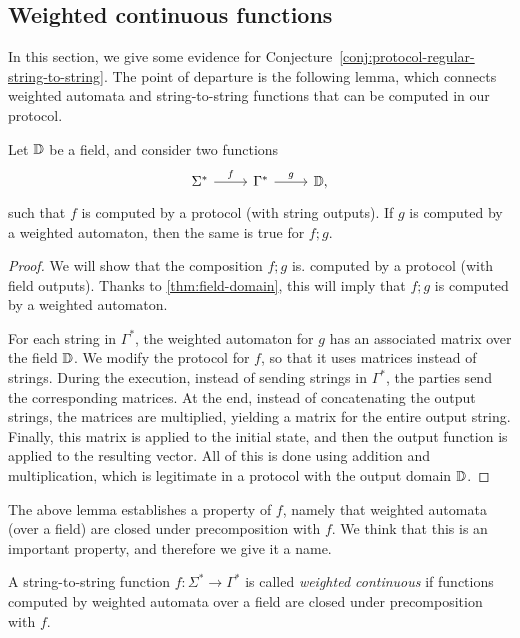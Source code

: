 \subsection{Weighted continuous functions}
\label{sec:continuity}
In this section, we give some evidence for Conjecture~\ref{conj:protocol-regular-string-to-string}. The point of departure is the following lemma, which connects weighted automata and string-to-string functions that can be computed in our protocol.

    \begin{lemma}
        \label{lem:postcomposition-weighted-automaton}
        Let $\mathbb D$ be a field, and consider two functions
        \[
        \begin{tikzcd}
        \Sigma^* 
        \ar[r,"f"]
        &
        \Gamma^*
        \ar[r,"g"]
        & 
        \domain,
        \end{tikzcd}
        \]
        such that $f$ is computed by a protocol (with string outputs). If $g$  is computed by a weighted automaton, then the same is true for  $f;g$.
    \end{lemma}
    \begin{proof}
        We will show that the composition $f;g$ is. computed by a protocol (with field outputs). Thanks to \cref{thm:field-domain}, this will imply that $f;g$ is computed by a weighted automaton.

        For each string in $\Gamma^*$, the weighted automaton for $g$ has an associated matrix over the field $\mathbb D$. We modify the protocol for $f$, so that it uses matrices instead of strings. During the execution, instead of sending strings in $\Gamma^*$, the parties send  the corresponding matrices. At the end, instead of concatenating the output strings, the matrices are multiplied, yielding a matrix for the entire output string. Finally, this matrix is applied to the initial state, and then the output function is applied to the resulting vector. All of this is done using addition and multiplication, which is legitimate in a protocol with the output domain $\mathbb D$.
    \end{proof}


The above lemma establishes a property of $f$, namely that weighted automata (over a field) are closed under precomposition with $f$. We think that this is an important property, and therefore we give it a name.


\begin{definition}
    \label{def:weighted-continuity}
    A string-to-string function $f : \Sigma^* \to \Gamma^*$ is called \emph{weighted continuous} if functions computed by weighted automata over a field are closed under precomposition with $f$.
\end{definition}


